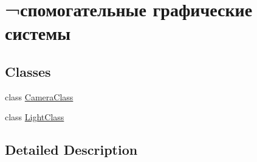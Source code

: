 \hypertarget{group___systems}{}\section{¬спомогательные графические системы}
\label{group___systems}
\subsection*{Classes}
\begin{DoxyCompactItemize}
\item 
class \hyperlink{class_camera_class}{Camera\+Class}
\item 
class \hyperlink{class_light_class}{Light\+Class}
\end{DoxyCompactItemize}


\subsection{Detailed Description}
